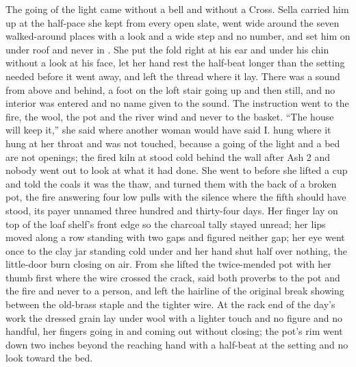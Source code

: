 The going of the light came without a bell and without a Cross. Sella carried him up at the half-pace she kept from every open slate, went wide around the seven walked-around places with a look and a wide step and no number, and set him on  under  roof and never in . She put the fold right at his ear and under his chin without a look at his face, let her hand rest the half-beat longer than the setting needed before it went away, and left the thread where it lay. There was a sound from above and behind, a foot on the loft stair going up and then still, and no interior was entered and no name given to the sound. The instruction went to the fire, the wool, the pot and the river wind and never to the basket. “The house will keep it,” she said where another woman would have said I.  hung where it hung at her throat and was not touched, because a going of the light and a bed are not openings; the fired kiln at  stood cold behind the wall after Ash 2 and nobody went out to look at what it had done. She went to  before she lifted a cup and told the coals it was the thaw, and turned them with the back of a broken pot, the fire answering four low pulls with the silence where the fifth should have stood, its payer unnamed three hundred and thirty-four days. Her finger lay on top of the loaf shelf's front edge so the charcoal tally stayed unread; her lips moved along a row standing with two gaps and figured neither gap; her eye went once to the clay jar standing cold under  and her hand shut half over nothing, the little-door burn closing on air. From  she lifted the twice-mended pot with her thumb first where the wire crossed the crack, said both proverbs to the pot and the fire and never to a person, and left the hairline of the original break showing between the old-brass staple and the tighter wire. At the rack end of the day's work the dressed grain lay under wool with a lighter touch and no figure and no handful, her fingers going in and coming out without closing; the pot's rim went down two inches beyond the reaching hand with a half-beat at the setting and no look toward the bed.

